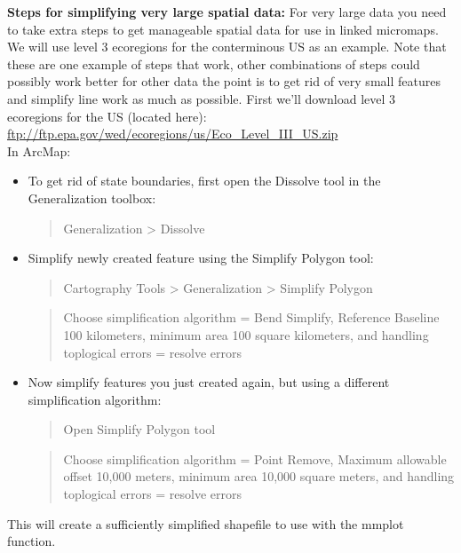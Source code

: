 \documentclass{article}
\begin{document}
\textbf{Steps for simplifying very large spatial data:}
For very large data you need to take extra steps to get manageable spatial data for use in linked micromaps. We will use level 3 ecoregions for the conterminous US as an example. Note that these are one example of steps that work, other combinations of steps could possibly work better for other data \textemdash the point is to get rid of very small features and simplify line work as much as possible.
First we'll download level 3 ecoregions for the US (located here):\\
\url{ftp://ftp.epa.gov/wed/ecoregions/us/Eco_Level_III_US.zip}\\
In ArcMap:
\begin{itemize}
  \item To get rid of state boundaries, first open the Dissolve tool in the Generalization toolbox:
  \begin{quote}Generalization > Dissolve\end{quote}
  \item Simplify newly created feature using the Simplify Polygon tool:
  \begin{quote}Cartography Tools > Generalization > Simplify Polygon\end{quote}
  \begin{quote}Choose simplification algorithm = Bend Simplify, Reference Baseline 100 kilometers, minimum area 100 square kilometers, and handling toplogical errors = resolve errors\end{quote}
  \item Now simplify features you just created again, but using a different simplification algorithm:
  \begin{quote}Open Simplify Polygon tool\end{quote}
  \begin{quote}Choose simplification algorithm = Point Remove, Maximum allowable offset 10,000 meters, minimum area 10,000 square meters, and handling toplogical errors = resolve errors\end{quote}
\end{itemize}
This will create a sufficiently simplified shapefile to use with the mmplot function.\\
\end{document}
